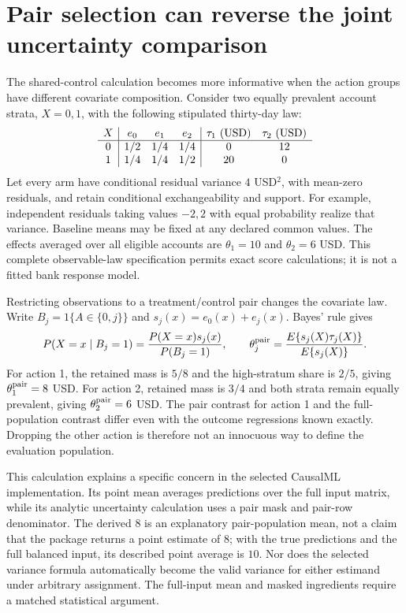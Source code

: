 \section{Pair selection can reverse the joint uncertainty comparison}
\label{exec17:s4-common-population}

The shared-control calculation becomes more informative when the action groups
have different covariate composition. Consider two equally prevalent account
strata, $X=0,1$, with the following stipulated thirty-day law:
\[
\begin{array}{c|ccc|cc}
 X&e_0&e_1&e_2&\tau_1\ ({\rm USD})&\tau_2\ ({\rm USD})\\ \hline
 0&1/2&1/4&1/4&0&12\\
 1&1/4&1/4&1/2&20&0
\end{array}
\]
Let every arm have conditional residual variance $4$ USD$^2$, with
mean-zero residuals, and retain conditional exchangeability and support.
For example, independent residuals taking values $-2,2$ with equal
probability realize that variance. Baseline means may be fixed at any
declared common values. The effects averaged over all eligible accounts are
$\theta_1=10$ and $\theta_2=6$ USD. This complete observable-law specification
permits exact score calculations; it is not a fitted bank response model.
\citep{exec17_s4_extension}

Restricting observations to a treatment/control pair changes the covariate
law. Write $B_j=1\{A\in\{0,j\}\}$ and
$s_j(x)=e_0(x)+e_j(x)$. Bayes' rule gives
\begin{equation}
 P(X=x\mid B_j=1)=\frac{P(X=x)s_j(x)}{P(B_j=1)},\qquad
 \theta_j^{\rm pair}=
       \frac{E\{s_j(X)\tau_j(X)\}}{E\{s_j(X)\}}.
 \label{exec17:s4-pair-target}
\end{equation}
For action 1, the retained mass is $5/8$ and the high-stratum share is
$2/5$, giving $\theta_1^{\rm pair}=8$ USD. For action 2, retained mass is
$3/4$ and both strata remain equally prevalent, giving
$\theta_2^{\rm pair}=6$ USD. The pair contrast for action 1 and the
full-population contrast differ even with the outcome regressions known
exactly. Dropping the other action is therefore not an innocuous way to
define the evaluation population.

This calculation explains a specific concern in the selected CausalML
implementation. Its point mean averages predictions over the full input
matrix, while its analytic uncertainty calculation uses a pair mask and
pair-row denominator. The derived $8$ is an explanatory pair-population
mean, not a claim that the package returns a point estimate of $8$; with
the true predictions and the full balanced input, its described point
average is $10$. Nor does the selected variance formula automatically
become the valid variance for either estimand under arbitrary assignment.
The full-input mean and masked ingredients require a matched statistical
argument.~\citep{exec14_causalml_primary}

